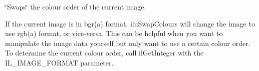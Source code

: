 \char`\"{}\+Swaps\char`\"{} the colour order of the current image. 

If the current image is in bgr(a) format, ilu\+Swap\+Colours will change the image to use rgb(a) format, or vice-\/versa. This can be helpful when you want to manipulate the image data yourself but only want to use a certain colour order. To determine the current colour order, call il\+Get\+Integer with the I\+L\+\_\+\+I\+M\+A\+G\+E\+\_\+\+F\+O\+R\+M\+A\+T parameter. 